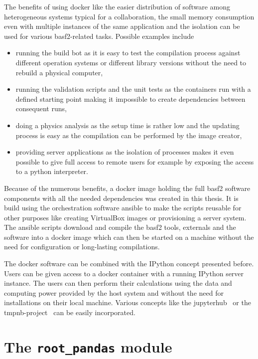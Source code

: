 The benefits of using docker like the easier distribution of software among heterogeneous systems typical for a collaboration, the small memory consumption even with multiple instances of the same application and the isolation can be used for various basf2-related tasks. Possible examples include
\begin{itemize}
 \item running the build bot as it is easy to test the compilation process against different operation systems or different library versions without the need to rebuild a physical computer,
 \item running the validation scripts and the unit tests as the containers run with a defined starting point making it impossible to create dependencies between consequent runs,
 \item doing a physics analysis as the setup time is rather low and the updating process is easy as the compilation can be performed by the image creator,
 \item providing server applications as the isolation of processes makes it even possible to give full access to remote users for example by exposing the access to a python interpreter.
\end{itemize}

Because of the numerous benefits, a docker image holding the full basf2 software components with all the needed dependencies was created in this thesis. It is build using the orchestration software ansible \cite{ansible} to make the scripts reusable for other purposes like creating VirtualBox images or provisioning a server system. The ansible scripts download and compile the basf2 tools, externals and the software into a docker image which can then be started on a machine without the need for configuration or long-lasting compilations.

The docker software can be combined with the IPython concept presented before. Users can be given access to a docker container with a running IPython server instance. The users can then perform their calculations using the data and computing power provided by the host system and without the need for installations on their local machine. Various concepts like the jupyterhub~\cite{jupyterhub} or the tmpnb-project~\cite{tmpnb} can be easily incorporated. 

\section{The \texttt{root\_pandas} module}

